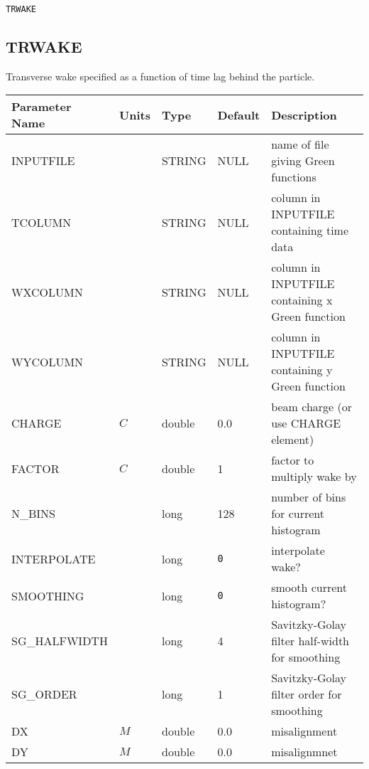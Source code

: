 \begin{latexonly}
\newpage
\begin{center}{\Large\verb|TRWAKE|}\end{center}
\end{latexonly}\subsection{TRWAKE}
Transverse wake specified as a function of time lag behind the particle.
\\
\begin{tabular}{|l|l|l|l|p{\descwidth}|} \hline
Parameter Name & Units & Type & Default & Description \\ \hline 
INPUTFILE &  & STRING &   NULL            & name of file giving Green functions  \\ \hline 
TCOLUMN &  & STRING &   NULL            & column in INPUTFILE containing time data  \\ \hline 
WXCOLUMN &  & STRING &   NULL            & column in INPUTFILE containing x Green function  \\ \hline 
WYCOLUMN &  & STRING &   NULL            & column in INPUTFILE containing y Green function  \\ \hline 
CHARGE & $C$ & double &  0.0 & beam charge (or use CHARGE element)  \\ \hline 
FACTOR & $C$ & double &   1 & factor to multiply wake by  \\ \hline 
N\_BINS &  & long &   128             & number of bins for current histogram  \\ \hline 
INTERPOLATE &  & long &  \verb|0| & interpolate wake?  \\ \hline 
SMOOTHING &  & long &  \verb|0| & smooth current histogram?  \\ \hline 
SG\_HALFWIDTH &  & long &   4               & Savitzky-Golay filter half-width for smoothing  \\ \hline 
SG\_ORDER &  & long &   1               & Savitzky-Golay filter order for smoothing  \\ \hline 
DX & $M$ & double &  0.0 & misalignment  \\ \hline 
DY & $M$ & double &  0.0 & misalignmnet  \\ \hline 
\end{tabular}

